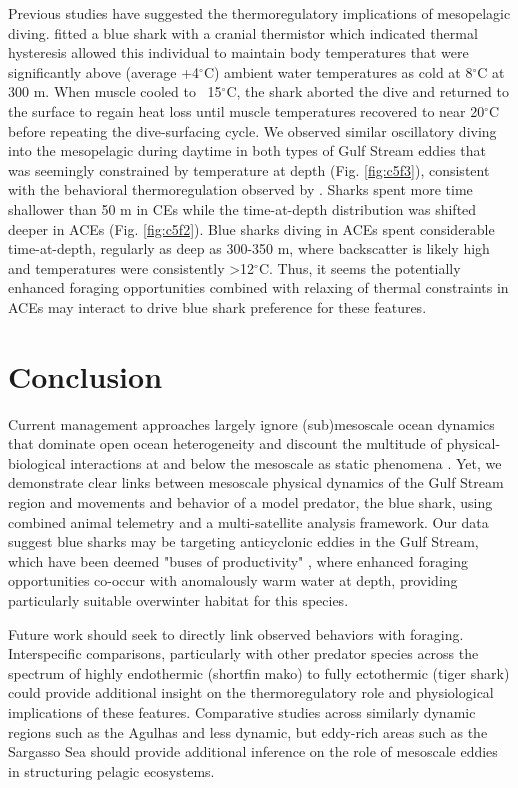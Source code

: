 Previous studies have suggested the thermoregulatory implications of mesopelagic diving. \citep{Carey1990} fitted a blue shark with a cranial thermistor which indicated thermal hysteresis allowed this individual to maintain body temperatures that were significantly above (average +4$^\circ$C) ambient water temperatures as cold at 8$^\circ$C at 300 m. When muscle cooled to ~15$^\circ$C, the shark aborted the dive and returned to the surface to regain heat loss until muscle temperatures recovered to near 20$^\circ$C before repeating the dive-surfacing cycle. We observed similar oscillatory diving into the mesopelagic during daytime in both types of Gulf Stream eddies that was seemingly constrained by temperature at depth (Fig. \ref{fig:c5f3}), consistent with the behavioral thermoregulation observed by \cite{Carey1990}. Sharks spent more time shallower than 50 m in CEs while the time-at-depth distribution was shifted deeper in ACEs (Fig. \ref{fig:c5f2}). Blue sharks diving in ACEs spent considerable time-at-depth, regularly as deep as 300-350 m, where backscatter is likely high \citep{Fennell2015} and temperatures were consistently >12$^\circ$C. Thus, it seems the potentially enhanced foraging opportunities combined with relaxing of thermal constraints in ACEs may interact to drive blue shark preference for these features.

\section{Conclusion}

Current management approaches largely ignore (sub)mesoscale ocean dynamics that dominate open ocean heterogeneity and discount the multitude of physical-biological interactions at and below the mesoscale as static phenomena \citep{Maxwell2015, Lewison2015}. Yet, we demonstrate clear links between mesoscale physical dynamics of the Gulf Stream region and movements and behavior of a model predator, the blue shark, using combined animal telemetry and a multi-satellite analysis framework. Our data suggest blue sharks may be targeting anticyclonic eddies in the Gulf Stream, which have been deemed "buses of productivity" \citep{Fennell2015}, where enhanced foraging opportunities co-occur with anomalously warm water at depth, providing particularly suitable overwinter habitat for this species. 

Future work should seek to directly link observed behaviors with foraging. Interspecific comparisons, particularly with other predator species across the spectrum of highly endothermic (\eg shortfin mako) to fully ectothermic (\eg tiger shark) could provide additional insight on the thermoregulatory role and physiological implications of these features. Comparative studies across similarly dynamic regions such as the Agulhas and less dynamic, but eddy-rich areas such as the Sargasso Sea should provide additional inference on the role of mesoscale eddies in structuring pelagic ecosystems. 

